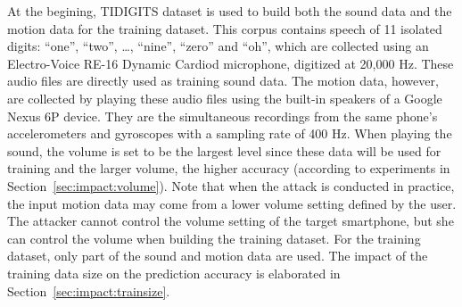 At the begining, TIDIGITS dataset is used to build both the sound data and the motion data for the training dataset.
%
This corpus contains speech of 11 isolated digits: ``one'', ``two'', \ldots, ``nine'', ``zero'' and ``oh'', which are collected using an Electro-Voice RE-16 Dynamic Cardiod microphone, digitized at 20,000 Hz.
%
%
These audio files are directly used as training sound data. 
The motion data, however, are collected by playing these audio files using the built-in speakers of a Google Nexus 6P device. They are the simultaneous recordings from the same phone's  accelerometers and gyroscopes with a sampling rate of 400 Hz.
When playing the sound, the volume is set to be the largest level since these data will be used for training and the larger volume, the higher accuracy (according to experiments in Section~\ref{sec:impact:volume}).
Note that when the {\attackName} attack is conducted in practice, the input motion data may come from a lower volume setting defined by the user. The attacker cannot control the volume setting of the target smartphone, but she can control the volume when building the training dataset. 
%
For the training dataset, only part of the sound and motion data are used. The impact of the training data size on the prediction accuracy is elaborated in Section~\ref{sec:impact:trainsize}.








%
%

%

